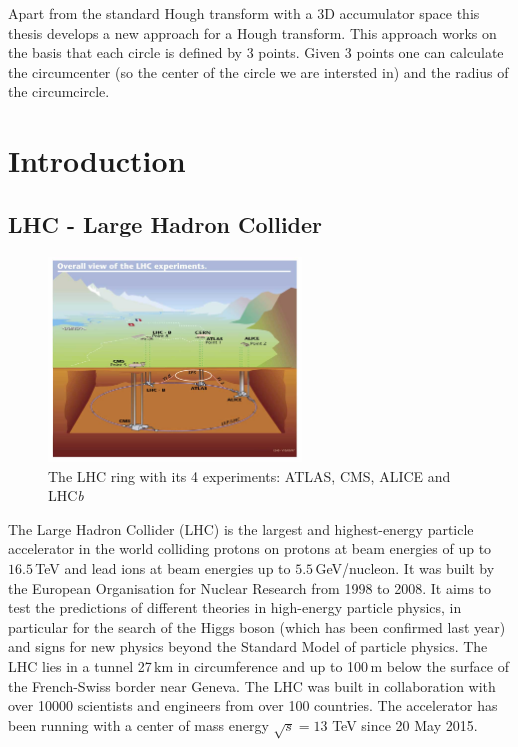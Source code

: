 \documentclass[11pt,twoside]{scrreprt}
\begin{document}
Apart from the standard Hough transform with a 3D accumulator space this thesis develops a new approach for a Hough transform. 
This approach works on the basis that each circle is defined by 3 points. Given 3 points one can calculate the circumcenter 
(so the center of the circle we are intersted in) and the radius of the circumcircle.

\tableofcontents
\listoftables
\listoffigures	
\listofcodesnippets

\chapter{Introduction}
\section{LHC - Large Hadron Collider} %
\label{sec:lhc_large_hadron_collider}
\begin{figure}[htb]
  \centering
  \includegraphics[width=0.6\textwidth]{pics/lhc}
  \caption{The LHC ring with its 4 experiments: ATLAS, CMS, ALICE and LHC\textit{b}}
  \label{fig:lhc}
\end{figure}

The Large Hadron Collider (LHC) is the largest and highest-energy particle accelerator in the world colliding protons on protons
at beam energies of up to $16.5$\,TeV and lead ions at beam energies up to $5.5$\,GeV/nucleon. It was built by the European 
Organisation for Nuclear Research from 1998 to 2008. It aims to test the predictions of different theories in high-energy particle 
physics, in particular for the search of the Higgs boson (which has been confirmed last year) and signs for new physics beyond 
the Standard Model of particle physics. The LHC lies in a tunnel 27\,km in circumference and up to 100\,m below the surface of the 
French-Swiss border near Geneva. The LHC was built in collaboration with over 10000 scientists and engineers from over 100 countries. 
The accelerator has been running with a center of mass energy $\sqrt{s} = 13$ TeV since 20 May 2015.
\end{document}
